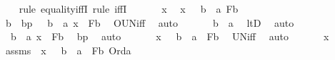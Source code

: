 \begin{isabellebody}
%
\isadelimproof
\ \ %
\endisadelimproof
%
\isatagproof
{}\isamarkupfalse%
\ {\isacharparenleft}{\kern0pt}rule\ equality{\isacharunderscore}{\kern0pt}iffI{\isacharsemicolon}{\kern0pt}\ rule\ iffI{\isacharparenright}{\kern0pt}\isanewline
{}\isamarkupfalse%
\ {\isacharminus}{\kern0pt}\ \isanewline
\ \ \isamarkupfalse%
\ x\ \isamarkupfalse%
\ {\isachardoublequoteopen}x\ {\isasymin}\ {\isacharparenleft}{\kern0pt}{\isasymUnion}\ b\ {\isacharless}{\kern0pt}\ a{\isachardot}{\kern0pt}\ F{\isacharparenleft}{\kern0pt}b{\isacharparenright}{\kern0pt}{\isacharparenright}{\kern0pt}{\isachardoublequoteclose}\ \isanewline
\ \ \isamarkupfalse%
\ \isamarkupfalse%
\ b\ \ bp\ {\isacharcolon}{\kern0pt}\ \ {\isachardoublequoteopen}b\ {\isacharless}{\kern0pt}\ a{\isachardoublequoteclose}\ {\isachardoublequoteopen}x\ {\isasymin}\ F{\isacharparenleft}{\kern0pt}b{\isacharparenright}{\kern0pt}{\isachardoublequoteclose}\ \isamarkupfalse%
\ OUN{\isacharunderscore}{\kern0pt}iff\ \isamarkupfalse%
\ auto\ \isanewline
\ \ \isamarkupfalse%
\ \isamarkupfalse%
\ {\isachardoublequoteopen}b\ {\isasymin}\ a{\isachardoublequoteclose}\ \isamarkupfalse%
\ ltD\ \isamarkupfalse%
\ auto\ \isanewline
\ \ \isamarkupfalse%
\ \isamarkupfalse%
\ {\isachardoublequoteopen}{\isasymexists}\ b\ {\isasymin}\ a{\isachardot}{\kern0pt}\ x\ {\isasymin}\ F{\isacharparenleft}{\kern0pt}b{\isacharparenright}{\kern0pt}{\isachardoublequoteclose}\ \isamarkupfalse%
\ bp\ \isamarkupfalse%
\ auto\ \isanewline
\ \ \isamarkupfalse%
\ \isamarkupfalse%
\ {\isachardoublequoteopen}x\ {\isasymin}\ {\isacharparenleft}{\kern0pt}{\isasymUnion}\ b\ {\isasymin}\ a\ {\isachardot}{\kern0pt}\ F{\isacharparenleft}{\kern0pt}b{\isacharparenright}{\kern0pt}{\isacharparenright}{\kern0pt}{\isachardoublequoteclose}\ \isamarkupfalse%
\ UN{\isacharunderscore}{\kern0pt}iff\ \isamarkupfalse%
\ auto\ \isanewline
{}\isamarkupfalse%
\ \isanewline
\ \ \isamarkupfalse%
\ x\ \isamarkupfalse%
\ assms\ {\isacharcolon}{\kern0pt}\ {\isachardoublequoteopen}x\ {\isasymin}\ {\isacharparenleft}{\kern0pt}{\isasymUnion}\ b\ {\isasymin}\ a\ {\isachardot}{\kern0pt}\ F{\isacharparenleft}{\kern0pt}b{\isacharparenright}{\kern0pt}{\isacharparenright}{\kern0pt}{\isachardoublequoteclose}\ {\isachardoublequoteopen}Ord{\isacharparenleft}{\kern0pt}a{\isacharparenright}{\kern0pt}{\isachardoublequoteclose}\isanewline

\end{isabellebody}
